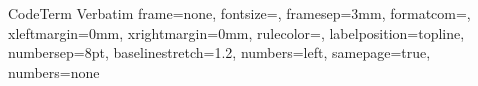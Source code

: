 \setlength{\FrameSep}{-5mm}
\newenvironment{Term}
    {\begin{center}\begin{Sbox}\begin{minipage}{\linewidth-17.4mm}}
    {\end{minipage}\end{Sbox}{\setlength{\fboxsep}{3mm}\vspace*{8pt}\fcolorbox{box-grey}{shadecolor}{\TheSbox}\vspace*{6pt}}\end{center}}

\DefineVerbatimEnvironment
    {CodeTerm}
    {Verbatim}
    {frame=none, fontsize=\scriptsize, framesep=3mm, formatcom={}, 
      xleftmargin=0mm, xrightmargin=0mm, rulecolor=\color{box-grey},
      labelposition=topline, numbersep=8pt, baselinestretch=1.2,
      numbers=left, samepage=true,
      numbers=none}



\renewcommand{\abstractname}{Introduction}



\setcounter{secnumdepth}{0}



\renewcommand\cftsecfont{\normalfont}
\renewcommand\cftsecpagefont{\normalfont}
\renewcommand{\cftsecleader}{\cftdotfill{\cftsecdotsep}}
\renewcommand\cftsecdotsep{\cftdot}
\renewcommand\cftsubsecdotsep{\cftdot}
\setcounter{tocdepth}{1}


\setlength{\droptitle}{-30pt}
\predate{\begin{center}\small}
\postdate{\par\end{center}}



\mydate



